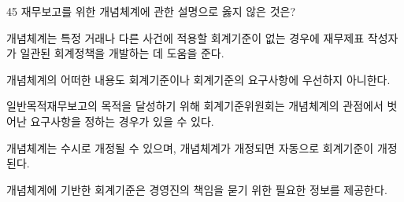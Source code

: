 \begin{question}{45}
재무보고를 위한 개념체계에 관한 설명으로 옳지 않은 것은?
\begin{choices}
  \item 개념체계는 특정 거래나 다른 사건에 적용할 회계기준이 없는 경우에 재무제표 작성자가 일관된 회계정책을 개발하는 데 도움을 준다.
  \item 개념체계의 어떠한 내용도 회계기준이나 회계기준의 요구사항에 우선하지 아니한다.
  \item 일반목적재무보고의 목적을 달성하기 위해 회계기준위원회는 개념체계의 관점에서 벗어난 요구사항을 정하는 경우가 있을 수 있다.
  \item 개념체계는 수시로 개정될 수 있으며, 개념체계가 개정되면 자동으로 회계기준이 개정된다.
  \item 개념체계에 기반한 회계기준은 경영진의 책임을 묻기 위한 필요한 정보를 제공한다.
\end{choices}
\end{question}
